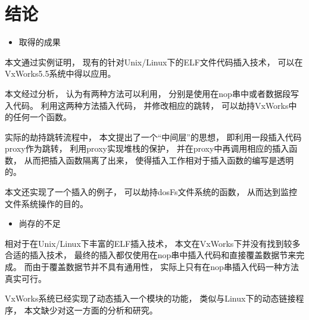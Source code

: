 \chapter*{结论}

\begin{itemize}
  \item 取得的成果
\end{itemize}

本文通过实例证明，
现有的针对Unix/Linux下的ELF文件代码插入技术，
可以在VxWorks5.5系统中得以应用。

本文经过分析，
认为有两种方法可以利用，
分别是使用在nop串中或者数据段写入代码。
利用这两种方法插入代码，
并修改相应的跳转，
可以劫持VxWorks中的任何一个函数。

实际的劫持跳转流程中，
本文提出了一个“中间层”的思想，
即利用一段插入代码proxy作为跳转，
利用proxy实现堆栈的保护，
并在proxy中再调用相应的插入函数，
从而把插入函数隔离了出来，
使得插入工作相对于插入函数的编写是透明的。

本文还实现了一个插入的例子，
可以劫持dosFs文件系统的函数，
从而达到监控文件系统操作的目的。

\begin{itemize}
  \item 尚存的不足
\end{itemize}

相对于在Unix/Linux下丰富的ELF插入技术，
本文在VxWorks下并没有找到较多合适的插入技术，
最终的插入都仅使用在nop串中插入代码和直接覆盖数据节来完成。
而由于覆盖数据节并不具有通用性，
实际上只有在nop串插入代码一种方法真实可行。

VxWorks系统已经实现了动态插入一个模块的功能，
类似与Linux下的动态链接程序，
本文缺少对这一方面的分析和研究。


\cleardoublepage

